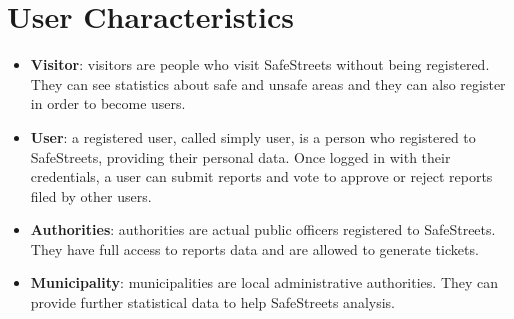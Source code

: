 \section{User Characteristics}
\begin{itemize}
  \item \textbf{Visitor}: visitors are people who visit SafeStreets without being registered. 
  They can see statistics about safe and unsafe areas and they can also register in order to become users.
  \item \textbf{User}: a registered user, called simply user, is a person who registered to SafeStreets, providing their personal data. Once logged in with their credentials, a user can submit reports and vote to approve or reject reports filed by other users.
  \item \textbf{Authorities}: authorities are actual public officers registered to SafeStreets. 
  They have full access to reports data and are allowed to generate tickets.
  \item \textbf{Municipality}: municipalities are local administrative authorities.
  They can provide further statistical data to help SafeStreets analysis.
\end{itemize}